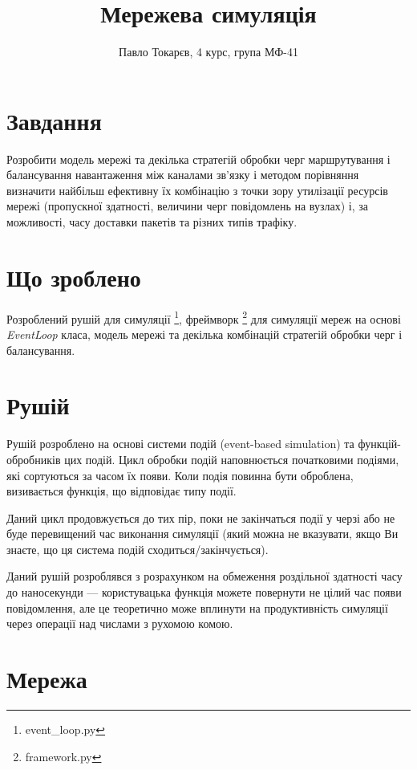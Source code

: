 \documentclass[11pt,a4paper]{article}
\author{Павло Токарєв, 4 курс, група МФ-41}
\title{Мережева симуляція}
\begin{document}
\maketitle

\tableofcontents

\section{Завдання}

Розробити модель мережі та декілька стратегій обробки черг маршрутування
і балансування навантаження між каналами зв'язку і 
методом порівняння визначити найбільш ефективну їх 
комбінацію з точки зору утилізації ресурсів мережі 
(пропускної здатності, величини черг повідомлень на вузлах)
і, за можливості, часу доставки пакетів та різних типів трафіку.

\section{Що зроблено}

Розроблений рушій для симуляції \footnote{event\_loop.py}, фреймворк  \footnote{framework.py} для симуляції мереж на основі \emph{EventLoop} класа, модель мережі та декілька комбінацій стратегій обробки черг і балансування.

\section{Рушій}

Рушій розроблено на основі системи подій (event-based simulation) 
та функцій-обробників цих подій. Цикл обробки подій наповнюється
початковими подіями, які сортуються за часом їх появи. Коли
подія повинна бути оброблена, визивається функція, що 
відповідає типу події.

Даний цикл продовжується до тих пір, поки не закінчаться події
у черзі або не буде перевищений час виконання симуляції 
(який можна не вказувати, якщо Ви знаєте, що ця система подій сходиться/закінчується).

Даний рушій розроблявся з розрахунком на обмеження 
роздільної здатності часу до наносекунди --- користувацька функція можете повернути не цілий час появи повідомлення, але це теоретично може вплинути на продуктивність симуляції через операції над числами з рухомою комою.

\section{Мережа}
\end{document}
